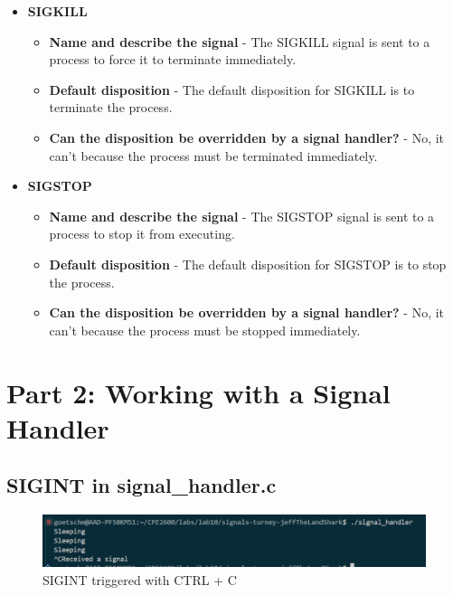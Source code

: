 \documentclass{assignment}
\begin{document}
\begin{itemize}
\begin{itemize}
    \end{itemize}
    \item \textbf{SIGKILL}
    \begin{itemize}
        \item \textbf{Name and describe the signal} - The SIGKILL signal is sent to a process to force it to terminate immediately.
        \item \textbf{Default disposition} - The default disposition for SIGKILL is to terminate the process.
        \item \textbf{Can the disposition be overridden by a signal handler?} - No, it can't because the process must be terminated immediately.
    \end{itemize}
    \item \textbf{SIGSTOP}
    \begin{itemize}
        \item \textbf{Name and describe the signal} - The SIGSTOP signal is sent to a process to stop it from executing.
        \item \textbf{Default disposition} - The default disposition for SIGSTOP is to stop the process.
        \item \textbf{Can the disposition be overridden by a signal handler?} - No, it can't because the process must be stopped immediately.
    \end{itemize}
\end{itemize}


\section{Part 2: Working with a Signal Handler}

\subsection{SIGINT in signal\_handler.c}
\begin{figure}
    \centering
    \includegraphics[width=1\linewidth]{images/SIGINT_ctrl_c.png}
    \caption{SIGINT triggered with CTRL + C}
\end{figure}
\end{document}
